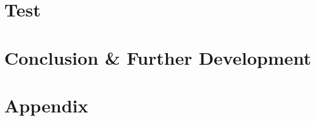 	\part{Test}
	    
		
	
	\part{Conclusion \& Further Development}
		
		
	
	\part{Appendix}
	\appendix{}
	
	
	
	
	
	
	
	\appendix
	


